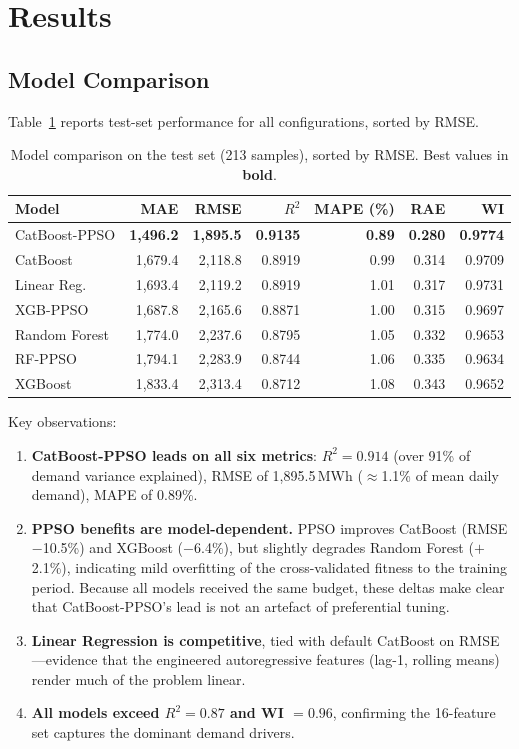 \section{Results}\label{sec:results}

\subsection{Model Comparison}

Table~\ref{tab:model_comparison} reports test-set performance for all configurations, sorted by RMSE.

\begin{table}[H]
\centering
\caption{Model comparison on the test set (213 samples), sorted by RMSE. Best values in \textbf{bold}.}
\label{tab:model_comparison}
\begin{tabular}{@{}lrrrrrr@{}}
\toprule
\textbf{Model} & \textbf{MAE} & \textbf{RMSE} & \textbf{$R^2$} & \textbf{MAPE (\%)} & \textbf{RAE} & \textbf{WI} \\
\midrule
CatBoost-PPSO & \textbf{1{,}496.2} & \textbf{1{,}895.5} & \textbf{0.9135} & \textbf{0.89} & \textbf{0.280} & \textbf{0.9774} \\
CatBoost & 1{,}679.4 & 2{,}118.8 & 0.8919 & 0.99 & 0.314 & 0.9709 \\
Linear Reg. & 1{,}693.4 & 2{,}119.2 & 0.8919 & 1.01 & 0.317 & 0.9731 \\
XGB-PPSO & 1{,}687.8 & 2{,}165.6 & 0.8871 & 1.00 & 0.315 & 0.9697 \\
Random Forest & 1{,}774.0 & 2{,}237.6 & 0.8795 & 1.05 & 0.332 & 0.9653 \\
RF-PPSO & 1{,}794.1 & 2{,}283.9 & 0.8744 & 1.06 & 0.335 & 0.9634 \\
XGBoost & 1{,}833.4 & 2{,}313.4 & 0.8712 & 1.08 & 0.343 & 0.9652 \\
\bottomrule
\end{tabular}
\end{table}

Key observations:

\begin{enumerate}
    \item \textbf{CatBoost-PPSO leads on all six metrics}: $R^2 = 0.914$ (over 91\% of demand variance explained), RMSE of 1{,}895.5\,MWh ($\approx$1.1\% of mean daily demand), MAPE of 0.89\%.
    \item \textbf{PPSO benefits are model-dependent.} PPSO improves CatBoost (RMSE $-$10.5\%) and XGBoost ($-$6.4\%), but slightly degrades Random Forest ($+$2.1\%), indicating mild overfitting of the cross-validated fitness to the training period. Because all models received the same budget, these deltas make clear that CatBoost-PPSO's lead is not an artefact of preferential tuning.
    \item \textbf{Linear Regression is competitive}, tied with default CatBoost on RMSE---evidence that the engineered autoregressive features (lag-1, rolling means) render much of the problem linear.
    \item \textbf{All models exceed $R^2 = 0.87$ and WI $= 0.96$}, confirming the 16-feature set captures the dominant demand drivers.
\end{enumerate}


